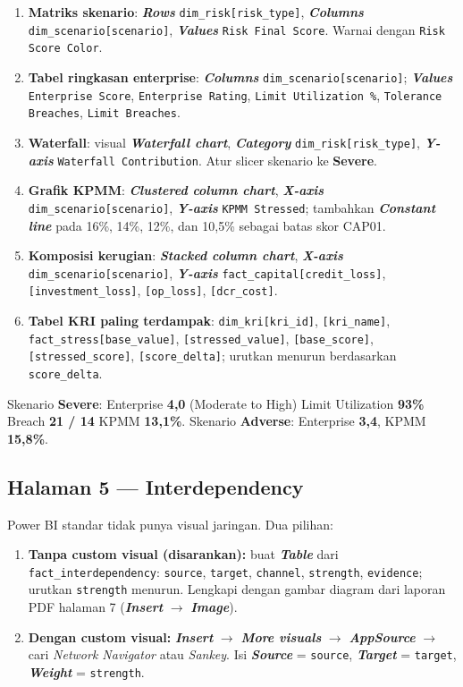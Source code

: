 \documentclass[11pt,a4paper]{article}
\newcommand{\file}[1]{\texttt{\small #1}}
\newcommand{\ui}[1]{\textbf{\textit{#1}}}
\begin{document}
\begin{enumerate}
\item \textbf{Matriks skenario}: \ui{Rows} \file{dim\_risk[risk\_type]}, \ui{Columns} \file{dim\_scenario[scenario]}, \ui{Values} \file{Risk Final Score}. Warnai dengan \file{Risk Score Color}.
\item \textbf{Tabel ringkasan enterprise}: \ui{Columns} \file{dim\_scenario[scenario]}; \ui{Values} \file{Enterprise Score}, \file{Enterprise Rating}, \file{Limit Utilization \%}, \file{Tolerance Breaches}, \file{Limit Breaches}.
\item \textbf{Waterfall}: visual \ui{Waterfall chart}, \ui{Category} \file{dim\_risk[risk\_type]}, \ui{Y-axis} \file{Waterfall Contribution}. Atur slicer skenario ke \textbf{Severe}.
\item \textbf{Grafik KPMM}: \ui{Clustered column chart}, \ui{X-axis} \file{dim\_scenario[scenario]}, \ui{Y-axis} \file{KPMM Stressed}; tambahkan \ui{Constant line} pada 16\%, 14\%, 12\%, dan 10,5\% sebagai batas skor CAP01.
\item \textbf{Komposisi kerugian}: \ui{Stacked column chart}, \ui{X-axis} \file{dim\_scenario[scenario]}, \ui{Y-axis} \file{fact\_capital[credit\_loss]}, \file{[investment\_loss]}, \file{[op\_loss]}, \file{[dcr\_cost]}.
\item \textbf{Tabel KRI paling terdampak}: \file{dim\_kri[kri\_id]}, \file{[kri\_name]}, \file{fact\_stress[base\_value]}, \file{[stressed\_value]}, \file{[base\_score]}, \file{[stressed\_score]}, \file{[score\_delta]}; urutkan menurun berdasarkan \file{score\_delta}.
\end{enumerate}

\begin{tipbox}
Skenario \textbf{Severe}: Enterprise \textbf{4{,}0} (Moderate to High) \textbullet{} Limit Utilization \textbf{93\%} \textbullet{} Breach \textbf{21 / 14} \textbullet{} KPMM \textbf{13{,}1\%}. Skenario \textbf{Adverse}: Enterprise \textbf{3{,}4}, KPMM \textbf{15{,}8\%}.
\end{tipbox}

\subsection{Halaman 5 --- Interdependency}

Power BI standar tidak punya visual jaringan. Dua pilihan:

\begin{enumerate}
\item \textbf{Tanpa custom visual (disarankan):} buat \ui{Table} dari \file{fact\_interdependency}: \file{source}, \file{target}, \file{channel}, \file{strength}, \file{evidence}; urutkan \file{strength} menurun. Lengkapi dengan gambar diagram dari laporan PDF halaman 7 (\ui{Insert} $\rightarrow$ \ui{Image}).
\item \textbf{Dengan custom visual:} \ui{Insert} $\rightarrow$ \ui{More visuals} $\rightarrow$ \ui{AppSource} $\rightarrow$ cari \emph{Network Navigator} atau \emph{Sankey}. Isi \ui{Source} = \file{source}, \ui{Target} = \file{target}, \ui{Weight} = \file{strength}.
\end{enumerate}
\end{document}
